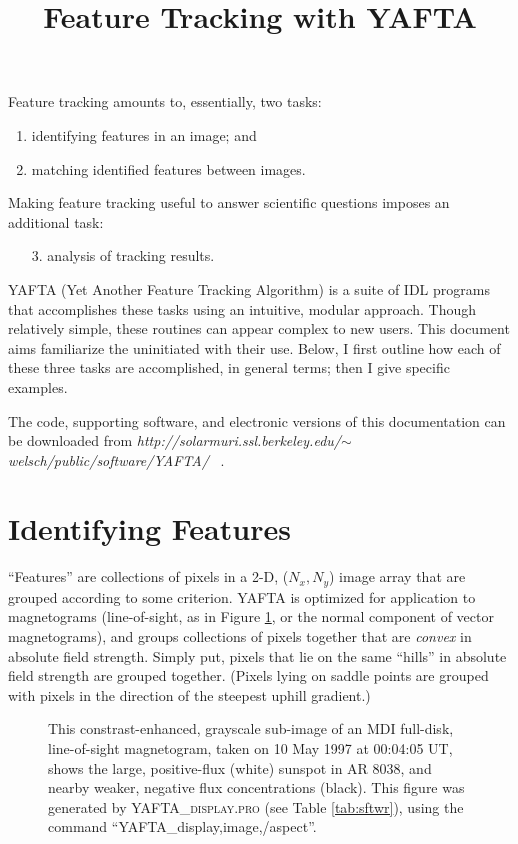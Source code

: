 \documentclass[12pt,preprint]{aastex}
\begin{document}
 

\title{Feature Tracking with YAFTA} 
%
\par
\noindent
Feature tracking amounts to, essentially, two tasks: 
\begin{enumerate}
\item identifying features in an image; and 
\item matching identified features between images.
\end{enumerate}

\noindent
Making feature tracking useful to answer scientific 
questions imposes an additional task:
\begin{enumerate}
\item[3.] analysis of tracking results.
\end{enumerate}

\noindent
\textsc{YAFTA} (Yet Another Feature Tracking Algorithm) is a suite of
IDL programs that accomplishes these tasks using an
intuitive, modular approach.  Though relatively simple, these routines
can appear complex to new users.  This document aims familiarize the
uninitiated with their use.  Below, I first outline how each of these
three tasks are accomplished, in general terms; then I give specific examples.

The code, supporting software, and electronic versions of this 
documentation can be downloaded from 
\textsl{http://solarmuri.ssl.berkeley.edu/$\sim$welsch/public/software/YAFTA/} 
~.

\section{Identifying Features}

\noindent
``Features'' are collections of pixels in a 2-D, ($N_x, N_y$) image
array that are grouped according to some criterion.  \textsc{YAFTA} is
optimized for application to magnetograms (line-of-sight, as in Figure
\ref{fig:data}, or the normal component of vector magnetograms), and
groups collections of pixels together that are {\em convex} in
absolute field strength.  Simply put, pixels that lie on the same
``hills'' in absolute field strength are grouped together.  (Pixels
lying on saddle points are grouped with pixels in the direction of the
steepest uphill gradient.)

\begin{figure}
\caption{This constrast-enhanced, grayscale sub-image of an MDI
full-disk, line-of-sight magnetogram, taken on 10 May 1997 at 00:04:05
UT, shows the large, positive-flux (white) sunspot in AR 8038, and
nearby weaker, negative flux concentrations (black). 
This figure was generated by \textsc{YAFTA\_display.pro} (see Table 
\ref{tab:sftwr}), using the command ``YAFTA\_display,image,/aspect''.
\label{fig:data}}
\end{figure}
%
\end{document}
